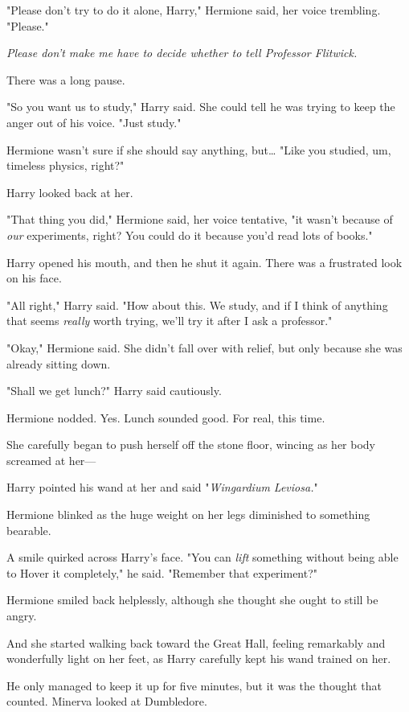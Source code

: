 "Please don't try to do it alone, Harry," Hermione said, her voice trembling. 
"Please."

\emph{Please don't make me have to decide whether to tell Professor Flitwick.}

There was a long pause.

"So you want us to study," Harry said. She could tell he was trying to keep the 
anger out of his voice. "Just study."

Hermione wasn't sure if she should say anything, but{\ldots} "Like you studied, 
um, timeless physics, right?"

Harry looked back at her.

"That thing you did," Hermione said, her voice tentative, "it wasn't because of 
\emph{our} experiments, right? You could do it because you'd read lots of 
books."

Harry opened his mouth, and then he shut it again. There was a frustrated look 
on his face.

"All right," Harry said. "How about this. We study, and if I think of anything 
that seems \emph{really} worth trying, we'll try it after I ask a professor."

"Okay," Hermione said. She didn't fall over with relief, but only because she 
was already sitting down.

"Shall we get lunch?" Harry said cautiously.

Hermione nodded. Yes. Lunch sounded good. For real, this time.

She carefully began to push herself off the stone floor, wincing as her body 
screamed at her---

Harry pointed his wand at her and said "\emph{Wingardium Leviosa.}"

Hermione blinked as the huge weight on her legs diminished to something 
bearable.

A smile quirked across Harry's face. "You can \emph{lift} something without 
being able to Hover it completely," he said. "Remember that experiment?"

Hermione smiled back helplessly, although she thought she ought to still be 
angry.

And she started walking back toward the Great Hall, feeling remarkably and 
wonderfully light on her feet, as Harry carefully kept his wand trained on her.

He only managed to keep it up for five minutes, but it was the thought that 
counted.
\sbreak
Minerva looked at Dumbledore.

